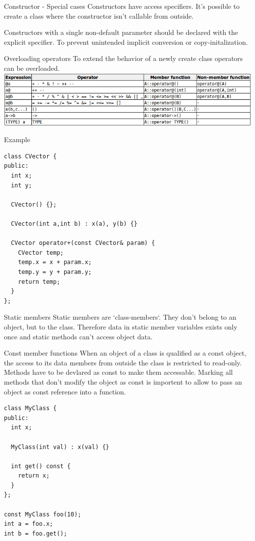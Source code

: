 \documentclass{beamer}
\begin{document}
\begin{frame}{Constructor - Special cases}
Constructors have access specifiers. It's possible to create a class where the
constructor isn't callable from outside.

Constructors with a single non-default parameter should be declared with the explicit
specifier. To prevent unintended implicit conversion or copy-initalization.
\end{frame}

\begin{frame}{Overloading operators}
To extend the behavior of a newly create class operators can be overloaded.
\includegraphics[scale=0.4]{img/OperatorOverload.png}
\end{frame}

\begin{frame}[fragile]{Example}
\begin{lstlisting}
class CVector {
public:
  int x;
  int y;

  CVector() {};

  CVector(int a,int b) : x(a), y(b) {}

  CVector operator+(const CVector& param) {
    CVector temp;
    temp.x = x + param.x;
    temp.y = y + param.y;
    return temp;
  }
};
\end{lstlisting}
\end{frame}

\begin{frame}{Static members}
Static members are `class-members`. They don't belong to an object, but to the
class. Therefore data in static member variables exists only once and static
methods can't access object data.
\end{frame}

\begin{frame}[fragile]{Const member functions}
When an object of a class is qualified as a const object, the access to its data
members from outside the class is restricted to read-only. Methods have to be
devlared as const to make them accessable. Marking all methods that don't modify
the object as const is importent to allow to pass an object as const reference
into a function.

\begin{lstlisting}
class MyClass {
public:
  int x;

  MyClass(int val) : x(val) {}

  int get() const {
    return x;
  }
};

const MyClass foo(10);
int a = foo.x;
int b = foo.get();
\end{lstlisting}

\end{frame}
\end{document}
